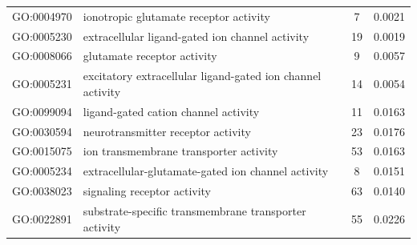 \documentclass[10pt,letterpaper]{article}
\begin{document}
\begin{table}[]
\begin{tabular}{llcc}
GO:0004970                                 & ionotropic glutamate receptor activity                     & 7                                                                                        & 0.0021                                \\
GO:0005230                                 & extracellular ligand-gated ion channel activity            & 19                                                                                       & 0.0019                                \\
GO:0008066                                 & glutamate receptor activity                                & 9                                                                                        & 0.0057                                \\
GO:0005231                                 & excitatory extracellular ligand-gated ion channel activity & 14                                                                                       & 0.0054                                \\
GO:0099094                                 & ligand-gated cation channel activity                       & 11                                                                                       & 0.0163                                \\
GO:0030594                                 & neurotransmitter receptor activity                         & 23                                                                                       & 0.0176                                \\
GO:0015075                                 & ion transmembrane transporter activity                     & 53                                                                                       & 0.0163                                \\
GO:0005234                                 & extracellular-glutamate-gated ion channel activity         & 8                                                                                        & 0.0151                                \\
GO:0038023                                 & signaling receptor activity                                & 63                                                                                       & 0.0140                                \\
GO:0022891                                 & substrate-specific transmembrane transporter activity      & 55                                                                                       & 0.0226                                \\

\end{tabular}
\end{table}
\end{document}
